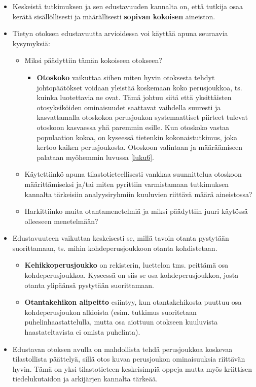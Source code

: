 \documentclass[
]{book}
\providecommand{\tightlist}{%
  \setlength{\itemsep}{0pt}\setlength{\parskip}{0pt}}
\begin{document}
\begin{itemize}
\tightlist
\item
  Keskeistä tutkimuksen ja sen edustavuuden kannalta on, että tutkija osaa kerätä sisällöllisesti ja määrällisesti \textbf{sopivan kokoisen} aineiston.
\item
  Tietyn otoksen edustavuutta arvioidessa voi käyttää apuna seuraavia kysymyksiä:

  \begin{itemize}
  \tightlist
  \item
    Miksi päädyttiin tämän kokoiseen otokseen?

    \begin{itemize}
    \tightlist
    \item
      \textbf{Otoskoko} vaikuttaa siihen miten hyvin otoksesta tehdyt johtopäätökset voidaan yleistää koskemaan koko perusjoukkoa, ts. kuinka luotettavia ne ovat. Tämä johtuu siitä että yksittäisten otosyksiköiden ominaisuudet saattavat vaihdella suuresti ja kasvattamalla otoskokoa perusjoukon systemaattiset piirteet tulevat otoskoon kasvaessa yhä paremmin esille. Kun otoskoko vastaa populaation kokoa, on kyseessä tietenkin kokonaistutkimus, joka kertoo kaiken perusjoukosta. Otoskoon valintaan ja määräämiseen palataan myöhemmin luvussa \ref{luku6}.
    \end{itemize}
  \item
    Käytettiinkö apuna tilastotieteellisesti vankkaa suunnittelua otoskoon määrittämiseksi ja/tai miten pyrittiin varmistamaan tutkimuksen kannalta tärkeisiin analyysiryhmiin kuuluvien riittävä määrä aineistossa?
  \item
    Harkittiinko muita otantamenetelmiä ja miksi päädyttiin juuri käytössä olleeseen menetelmään?
  \end{itemize}
\item
  Edustavuuteen vaikuttaa keskeisesti se, millä tavoin otanta pystytään suorittamaan, ts. mihin kohdeperusjoukkoon otanta kohdistetaan.

  \begin{itemize}
  \tightlist
  \item
    \textbf{Kehikkoperusjoukko} on rekisterin, luettelon tms. peittämä osa kohdeperusjoukkoa. Kyseessä on siis se osa kohdeperusjoukkoa, josta otanta ylipäänsä pystytään suorittamaan.
  \item
    \textbf{Otantakehikon alipeitto} esiintyy, kun otantakehikosta puuttuu osa kohdeperusjoukon alkioista (esim. tutkimus suoritetaan puhelinhaastattelulla, mutta osa aiottuun otokseen kuuluvista haastateltavista ei omista puhelinta).
  \end{itemize}
\item
  Edustavan otoksen avulla on mahdollista tehdä perusjoukkoa koskevaa tilastollista päättelyä, sillä otos kuvaa perusjoukon ominaisuuksia riittävän hyvin. Tämä on yksi tilastotieteen keskeisimpiä oppeja mutta myös kriittisen tiedelukutaidon ja arkijärjen kannalta tärkeää.


\end{itemize}
\end{document}
